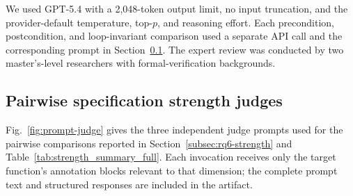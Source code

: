 {We used GPT-5.4 with a 2,048-token output limit, no input truncation, and the provider-default temperature, top-$p$, and reasoning effort. Each precondition, postcondition, and loop-invariant comparison used a separate API call and the corresponding prompt in Section~\ref{app:prompt-strength-judge}. The expert review was conducted by two master's-level researchers with formal-verification backgrounds.}

\subsection{{Pairwise specification strength judges}}
\label{app:prompt-strength-judge}

{Fig.~\ref{fig:prompt-judge} gives the three independent judge prompts used for the pairwise comparisons reported in Section~\ref{subsec:rq6-strength} and Table~\ref{tab:strength_summary_full}. Each invocation receives only the target function's annotation blocks relevant to that dimension; the complete prompt text and structured responses are included in the artifact.}

